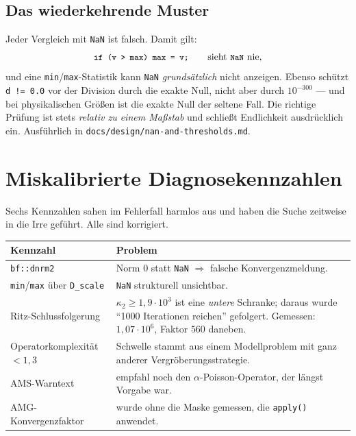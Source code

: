 \documentclass[11pt,a4paper]{article}
\newcommand{\code}[1]{\texttt{\small #1}}
\newcommand{\kappazwei}{\kappa_2}
\begin{document}
\subsection*{Das wiederkehrende Muster}

Jeder Vergleich mit \code{NaN} ist falsch. Damit gilt:
\[
  \code{if (v > max) max = v;} \qquad\text{sieht \code{NaN} nie,}
\]
und eine \code{min}/\code{max}-Statistik kann \code{NaN} \emph{grundsätzlich}
nicht anzeigen. Ebenso schützt \code{d != 0.0} vor der Division durch die exakte
Null, nicht aber durch $10^{-300}$ --- und bei physikalischen Größen ist die
exakte Null der seltene Fall. Die richtige Prüfung ist stets \emph{relativ zu
einem Maßstab} und schließt Endlichkeit ausdrücklich ein. Ausführlich in
\code{docs/design/nan-and-thresholds.md}.

\section{Miskalibrierte Diagnosekennzahlen}

Sechs Kennzahlen sahen im Fehlerfall harmlos aus und haben die Suche zeitweise
in die Irre geführt. Alle sind korrigiert.

\begin{center}
\small
\begin{tabular}{p{4.4cm}p{9.4cm}}
\toprule
\textbf{Kennzahl} & \textbf{Problem} \\
\midrule
\code{bf::dnrm2} & Norm $0$ statt \code{NaN} $\Rightarrow$ falsche
  Konvergenzmeldung. \\
\code{min}/\code{max} über \code{D\_scale} & \code{NaN} strukturell unsichtbar.
  \\
Ritz-Schlussfolgerung & $\kappazwei\ge1{,}9\cdot10^{3}$ ist eine \emph{untere}
  Schranke; daraus wurde \textquotedblleft 1000 Iterationen reichen\textquotedblright{} gefolgert.
  Gemessen: $1{,}07\cdot10^{6}$, Faktor $560$ daneben. \\
Operatorkomplexität $<1{,}3$ & Schwelle stammt aus einem Modellproblem mit
  ganz anderer Vergröberungsstrategie. \\
AMS-Warntext & empfahl noch den $\alpha$-Poisson-Operator, der längst Vorgabe
  war. \\
AMG-Konvergenzfaktor & wurde ohne die Maske gemessen, die \code{apply()}
  anwendet. \\
\bottomrule
\end{tabular}
\end{center}
\end{document}
